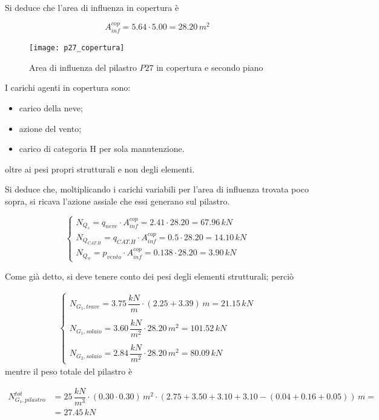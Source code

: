 Si deduce che l'area di influenza in copertura è

\[
	A_{inf}^{cop} = 5.64\cdot 5.00 = 28.20\,m^2
\]

\begin{figure}
	\centering
	\texttt{[image: p27\_copertura]}
	\caption{Area di influenza del pilastro $P27$ in copertura e secondo piano}
	\label{fig:infAreaCopertura}
\end{figure}

I carichi agenti in copertura sono:
\begin{itemize}
	\item carico della neve;
	\item azione del vento;
	\item carico di categoria H per sola manutenzione.
\end{itemize}
oltre ai pesi propri strutturali e non degli elementi.

Si deduce che, moltiplicando i carichi variabili per l'area di influenza trovata poco sopra, si ricava l'azione assiale che essi generano sul pilastro.

\[
	\begin{cases}
		N_{Q_s} = q_{neve} \cdot A_{inf}^{cop} = 2.41\cdot 28.20 = 67.96\,kN\\
		N_{Q_{CAT.H}} = q_{CAT.H} \cdot A_{inf}^{cop} = 0.5\cdot 28.20 = 14.10\,kN\\
		N_{Q_w} = p_{vento}\cdot A_{inf}^{cop} = 0.138\cdot 28.20 = 3.90\,kN
	\end{cases}
\]

Come già detto, si deve tenere conto dei pesi degli elementi strutturali; perciò

\begin{align*}
	\begin{cases}
		N_{G_1, trave} = 3.75\,\dfrac{kN}{m}\cdot(2.25 + 3.39)\,m = 21.15\,kN\\\\
		N_{G_1, solaio} = 3.60\,\dfrac{kN}{m^2}\cdot28.20\,m^2 = 101.52\,kN\\\\
		N_{G_2, solaio} = 2.84\,\dfrac{kN}{m^2}\cdot28.20\,m^2 = 80.09\,kN
	\end{cases}
\end{align*}
mentre il peso totale del pilastro è 

\begin{align*}
	N_{G_1, pilastro}^{tot} &= 25\,\dfrac{kN}{m^3}\cdot(0.30\cdot 0.30)\,m^2\cdot(2.75 +3.50+3.10+3.10-(0.04+0.16+0.05))\,m =\\&= 27.45\,kN
\end{align*}


